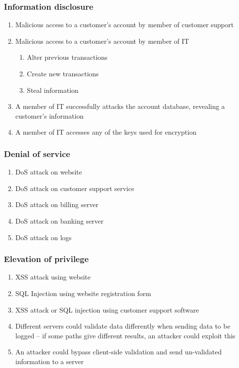 \subsubsection{Information disclosure}

\begin{enumerate}
    \item Malicious access to a customer's account by member of customer support

    \item Malicious access to a customer's account by member of IT
    \begin{enumerate}
        \item Alter previous transactions
        \item Create new transactions
        \item Steal information
    \end{enumerate}

    \item A member of IT successfully attacks the account database, revealing a customer's information

    \item A member of IT accesses any of the keys used for encryption
\end{enumerate}

\subsubsection{Denial of service}

\begin{enumerate}[resume]
    \item DoS attack on website
    \item DoS attack on customer support service
    \item DoS attack on billing server
    \item DoS attack on banking server
    \item DoS attack on logs
\end{enumerate}

\subsubsection{Elevation of privilege}

\begin{enumerate}[resume]
    \item XSS attack using website
    \item SQL Injection using website registration form
    \item XSS attack or SQL injection using customer support software
    \item Different servers could validate data differently when sending data to be logged – if some paths give different results, an attacker could exploit this
    \item An attacker could bypass client-side validation and send un-validated information to a server
\end{enumerate}